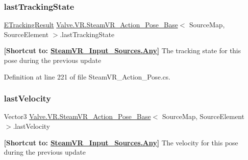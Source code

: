 \subsubsection{\texorpdfstring{lastTrackingState}{lastTrackingState}}
{\footnotesize\ttfamily \mbox{\hyperlink{namespace_valve_1_1_v_r_abe6feab98f33191b7c27b4292012e90a}{E\+Tracking\+Result}} \mbox{\hyperlink{class_valve_1_1_v_r_1_1_steam_v_r___action___pose___base}{Valve.\+V\+R.\+Steam\+V\+R\+\_\+\+Action\+\_\+\+Pose\+\_\+\+Base}}$<$ Source\+Map, Source\+Element $>$.last\+Tracking\+State\hspace{0.3cm}{\ttfamily [get]}}



{\bfseries{\mbox{[}Shortcut to\+: \mbox{\hyperlink{namespace_valve_1_1_v_r_a82e5bf501cc3aa155444ee3f0662853faed36a1ef76a59ee3f15180e0441188ad}{Steam\+V\+R\+\_\+\+Input\+\_\+\+Sources.\+Any}}\mbox{]}}} The tracking state for this pose during the previous update 



Definition at line 221 of file Steam\+V\+R\+\_\+\+Action\+\_\+\+Pose.\+cs.

\mbox{\label{class_valve_1_1_v_r_1_1_steam_v_r___action___pose___base_a46d9cbd329e828e28127f7af2d470e8c}} 
\subsubsection{\texorpdfstring{lastVelocity}{lastVelocity}}
{\footnotesize\ttfamily Vector3 \mbox{\hyperlink{class_valve_1_1_v_r_1_1_steam_v_r___action___pose___base}{Valve.\+V\+R.\+Steam\+V\+R\+\_\+\+Action\+\_\+\+Pose\+\_\+\+Base}}$<$ Source\+Map, Source\+Element $>$.last\+Velocity\hspace{0.3cm}{\ttfamily [get]}}



{\bfseries{\mbox{[}Shortcut to\+: \mbox{\hyperlink{namespace_valve_1_1_v_r_a82e5bf501cc3aa155444ee3f0662853faed36a1ef76a59ee3f15180e0441188ad}{Steam\+V\+R\+\_\+\+Input\+\_\+\+Sources.\+Any}}\mbox{]}}} The velocity for this pose during the previous update 



